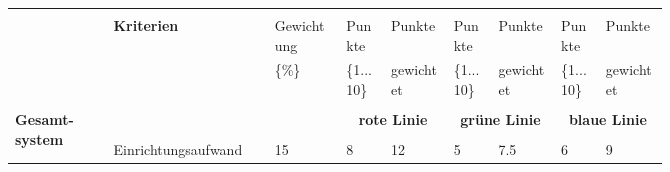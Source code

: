 \documentclass[main.tex]{subfiles} %
\begin{document}
\begin{landscape}
    \begin{table}[H]
        \centering
        \begin{tabular}{|p{0.11\linewidth}|p{0.18\linewidth}|p{0.085\linewidth}|p{0.057\linewidth}|p{0.07\linewidth}|p{0.057\linewidth}|p{0.07\linewidth}|p{0.057\linewidth}|p{0.07\linewidth}|}
            \hline
                                                      &                                     &                                            &                                           &                                            &            &             &            &             \\[-9pt]
                                                      & \multirow{2}{*}{\textbf{Kriterien}} & Gewichtung                                 & Punkte                                    & Punkte                                     & Punkte     & Punkte      & Punkte     & Punkte      \\[1pt]
                                                      &                                     & \{\%\}                                     & \{1...10\}                                & gewichtet                                  & \{1...10\} & gewichtet   & \{1...10\} & gewichtet   \\[1pt]
            \hline
            \hline
                                                      & \multicolumn{2}{c|}{}               & \multicolumn{2}{c|}{}                      & \multicolumn{2}{c|}{}                     & \multicolumn{2}{c|}{}                                                                            \\[-9pt]
            \multirow{7}{4em}{\textbf{Gesamt-system}} & \multicolumn{2}{c|}{}               & \multicolumn{2}{c|}{\textbf{rote Linie}}   & \multicolumn{2}{c|}{\textbf{grüne Linie}} & \multicolumn{2}{c|}{\textbf{blaue Linie}}                                                        \\[1pt]
            \cline{2-9}
                                                      &                                     &                                            &                                           &                                            &            &             &            &             \\[-9pt]
                                                      & Einrichtungsaufwand                 & 15                                         & 8                                         & 12                                         & 5          & 7.5         & 6          & 9           \\[1pt]

\end{tabular}
\end{table}
\end{landscape}
\end{document}
